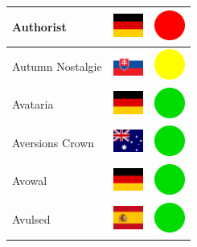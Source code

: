 \documentclass[12pt, a4paper, twoside]{report}
\begin{document}
\begin{center}
\begin{longtable}{|p{5cm}|p{2cm}|p{2cm}|}
 Authorist                                                  & \includegraphics[width=1cm]{../img/flags/de} &   \includegraphics[width=1cm]{../likes/n} \\ \hline
 Autumn Nostalgie                                           & \includegraphics[width=1cm]{../img/flags/sk} &   \includegraphics[width=1cm]{../likes/m} \\ \hline
 Avataria                                                   & \includegraphics[width=1cm]{../img/flags/de} &   \includegraphics[width=1cm]{../likes/y} \\ \hline
 Aversions Crown                                            & \includegraphics[width=1cm]{../img/flags/au} &   \includegraphics[width=1cm]{../likes/y} \\ \hline
 Avowal                                                     & \includegraphics[width=1cm]{../img/flags/de} &   \includegraphics[width=1cm]{../likes/y} \\ \hline
 Avulsed                                                    & \includegraphics[width=1cm]{../img/flags/es} &   \includegraphics[width=1cm]{../likes/y} \\ \hline

\end{longtable}
\end{center}
\end{document}
